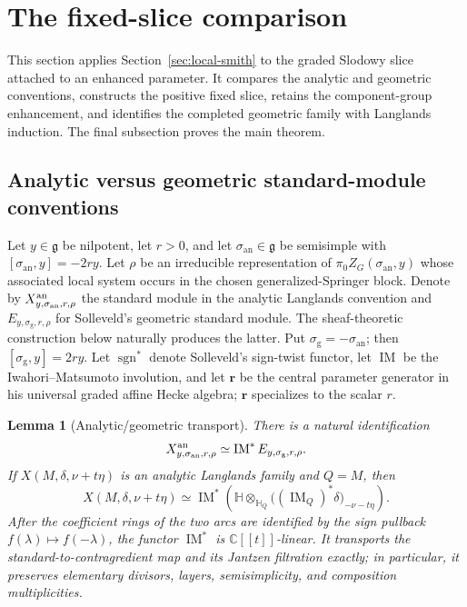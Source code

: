 \documentclass[11pt]{amsart}
\newtheorem{lemma}[theorem]{Lemma}
\theoremstyle{definition}
\theoremstyle{remark}
\newcommand{\Hh}{\mathbb H}
\begin{document}
\section{The fixed-slice comparison}
\label{sec:fixed-slice-comparison}

This section applies Section~\ref{sec:local-smith} to the graded Slodowy
slice attached to an enhanced parameter.  It compares the analytic and
geometric conventions, constructs the positive fixed slice, retains the
component-group enhancement, and identifies the completed geometric family
with Langlands induction.  The final subsection proves the main theorem.

\subsection*{Analytic versus geometric standard-module conventions}
Let $y\in\mathfrak g$ be nilpotent, let $r>0$, and let
$\sigma_{\mathrm{an}}\in\mathfrak g$ be semisimple with
$[\sigma_{\mathrm{an}},y]=-2ry$.  Let $\rho$ be an irreducible
representation of $\pi_0Z_G(\sigma_{\mathrm{an}},y)$ whose associated local
system occurs in the chosen generalized-Springer block.  Denote by
$X^{\rm an}_{y,\sigma_{\rm an},r,\rho}$ the standard module in the
analytic Langlands convention and
$E_{y,\sigma_{\mathrm g},r,\rho}$ for Solleveld's geometric standard module.
The sheaf-theoretic construction below naturally produces the latter.  Put
$\sigma_{\mathrm g}=-\sigma_{\mathrm{an}}$; then
$[\sigma_{\mathrm g},y]=2ry$.
Let $\operatorname{sgn}^*$ denote Solleveld's sign-twist functor, let
$\operatorname{IM}$ be the Iwahori--Matsumoto involution, and let $\mathbf r$
be the central parameter generator in his universal graded affine Hecke
algebra; $\mathbf r$ specializes to the scalar $r$.

\begin{lemma}[Analytic/geometric transport]
\label{lem:analytic-geometric-transport}
There is a natural identification
\[
 X^{\rm an}_{y,\sigma_{\rm an},r,\rho}
 \simeq \operatorname{IM}^{*}E_{y,\sigma_{\rm g},r,\rho}.
\]
If $X(M,\delta,\nu+t\eta)$ is an analytic Langlands family
and $Q=M$, then
\[
 X(M,\delta,\nu+t\eta)\simeq
 \operatorname{IM}^*\!\left(
  \Hh\otimes_{\Hh_Q}
  \bigl((\operatorname{IM}_Q)^*\delta\bigr)_{-\nu-t\eta}
 \right).
\]
After the coefficient rings of the two arcs are identified by the sign
pullback $f(\lambda)\mapsto f(-\lambda)$, the functor
$\operatorname{IM}^*$ is $\mathbb C[[t]]$-linear.  It transports the
standard-to-contragredient map and its Jantzen filtration exactly; in
particular, it preserves elementary divisors, layers, semisimplicity, and
composition multiplicities.
\end{lemma}
\end{document}

